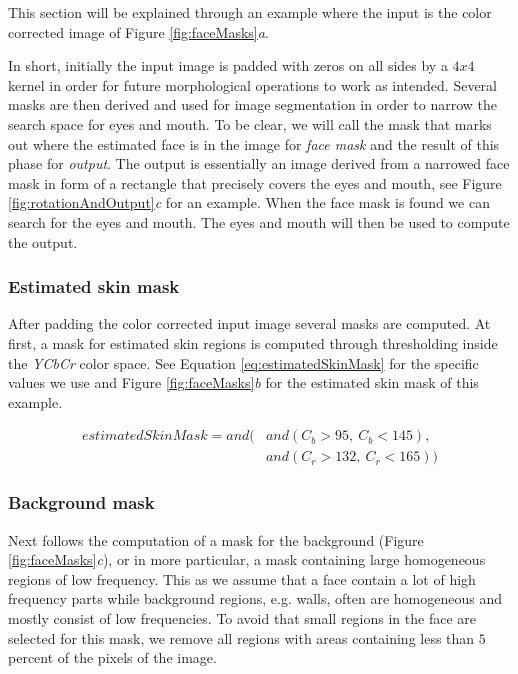 This section will be explained through an example where the input is the color corrected image of Figure \ref{fig:faceMasks}\textit{a}.



In short, initially the input image is padded with zeros on all sides by a $4x4$ kernel in order for future morphological operations to work as intended. Several masks are then derived and used for image segmentation in order to narrow the search space for eyes and mouth. To be clear, we will call the mask that marks out where the estimated face is in the image for \textit{face mask} and the result of this phase for \textit{output}. The output is essentially an image derived from a narrowed face mask in form of a rectangle that precisely covers the eyes and mouth, see Figure \ref{fig:rotationAndOutput}\textit{c} for an example. When the face mask is found we can search for the eyes and mouth. The eyes and mouth will then be used to compute the output. 




\subsubsection{Estimated skin mask}
After padding the color corrected input image several masks are computed. At first, a mask for estimated skin regions is computed through thresholding inside the \textit{YCbCr} color space. See Equation \ref{eq:estimatedSkinMask} for the specific values we use and Figure \ref{fig:faceMasks}\textit{b} for the estimated skin mask of this example.

\begin{equation} \label{eq:estimatedSkinMask}
\begin{split}
estimatedSkinMask = and( & and(C_{b}> 95, \ C_{b} < 145), \\
 & and(C_{r} > 132, \ C_{r} < 165))
\end{split}
\end{equation}

\subsubsection{Background mask}
Next follows the computation of a mask for the background (Figure \ref{fig:faceMasks}\textit{c}), or in more particular, a mask containing large homogeneous regions of low frequency. This as we assume that a face contain a lot of high frequency parts while background regions, e.g. walls, often are homogeneous and mostly consist of low frequencies. To avoid that small regions in the face are selected for this mask, we remove all regions with areas containing less than $5$ percent of the pixels of the image.

